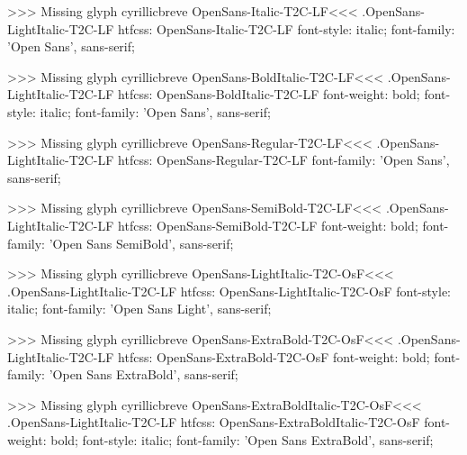 >>>
Missing glyph	cyrillicbreve
\<OpenSans-Italic-T2C-LF\><<<
.OpenSans-LightItalic-T2C-LF
htfcss:  OpenSans-Italic-T2C-LF  font-style: italic; font-family: 'Open Sans', sans-serif;

>>>
Missing glyph	cyrillicbreve
\<OpenSans-BoldItalic-T2C-LF\><<<
.OpenSans-LightItalic-T2C-LF
htfcss:  OpenSans-BoldItalic-T2C-LF  font-weight: bold; font-style: italic; font-family: 'Open Sans', sans-serif;

>>>
Missing glyph	cyrillicbreve
\<OpenSans-Regular-T2C-LF\><<<
.OpenSans-LightItalic-T2C-LF
htfcss:  OpenSans-Regular-T2C-LF  font-family: 'Open Sans', sans-serif;

>>>
Missing glyph	cyrillicbreve
\<OpenSans-SemiBold-T2C-LF\><<<
.OpenSans-LightItalic-T2C-LF
htfcss:  OpenSans-SemiBold-T2C-LF  font-weight: bold; font-family: 'Open Sans SemiBold', sans-serif;

>>>
Missing glyph	cyrillicbreve
\<OpenSans-LightItalic-T2C-OsF\><<<
.OpenSans-LightItalic-T2C-LF
htfcss:  OpenSans-LightItalic-T2C-OsF  font-style: italic; font-family: 'Open Sans Light', sans-serif;

>>>
Missing glyph	cyrillicbreve
\<OpenSans-ExtraBold-T2C-OsF\><<<
.OpenSans-LightItalic-T2C-LF
htfcss:  OpenSans-ExtraBold-T2C-OsF  font-weight: bold; font-family: 'Open Sans ExtraBold', sans-serif;

>>>
Missing glyph	cyrillicbreve
\<OpenSans-ExtraBoldItalic-T2C-OsF\><<<
.OpenSans-LightItalic-T2C-LF
htfcss:  OpenSans-ExtraBoldItalic-T2C-OsF  font-weight: bold; font-style: italic; font-family: 'Open Sans ExtraBold', sans-serif;

